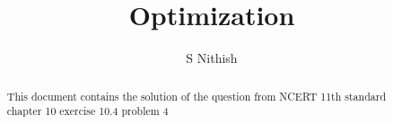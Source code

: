 \documentclass[journal,12pt,twocolumn]{IEEEtran}
\begin{document}
\let\StandardTheFigure\thefigure
\let\vec\mathbf
\renewcommand{\thefigure}{\theproblem}



\def\putbox#1#2#3{\makebox[0in][l]{\makebox[#1][l]{}\raisebox{\baselineskip}[0in][0in]{\raisebox{#2}[0in][0in]{#3}}}}
     \def\rightbox#1{\makebox[0in][r]{#1}}
     \def\centbox#1{\makebox[0in]{#1}}
     \def\topbox#1{\raisebox{-\baselineskip}[0in][0in]{#1}}
     \def\midbox#1{\raisebox{-0.5\baselineskip}[0in][0in]{#1}}

\vspace{3cm}


\title{Optimization}
\author{S Nithish}
\maketitle

\newpage


\bigskip

\renewcommand{\thefigure}{\theenumi}
\renewcommand{\thetable}{\theenumi}


\begin{abstract}
This document contains the solution of the question from NCERT 11th standard chapter 10 exercise 10.4 problem 4
\end{abstract}

%

%
%
\end{document}
